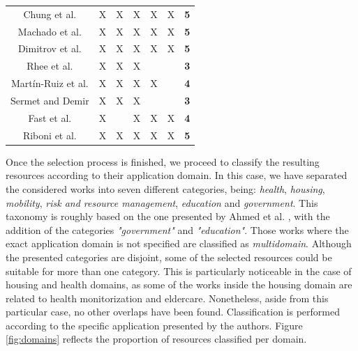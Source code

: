 \begin{table}[H]
{\begin{tabular}{ccccccc}
Chung et al. \citep{chungetal2018}          & X           & X           & X           & X           & X           & \textbf{5}                \\ 
Machado et al. \citep{machadoetal}        & X           & X           & X           & X           & X           & \textbf{5}                \\ 
Dimitrov et al. \citep{dimitrovetal}       & X           & X           & X           & X           & X           & \textbf{5}                \\ 
Rhee et al. \citep{rheeetal}            & X           & X           & X           &             &             & \textbf{3}                \\ 
Martín-Ruiz et al. \citep{Martinruizetal}    & X           & X           & X           & X           &             & \textbf{4}                \\ 
Sermet and Demir \citep{sermetetal}      & X           & X           & X           &             &             & \textbf{3}                \\ 
Fast et al. \citep{fastetal}           & X           &             & X           & X           & X           & \textbf{4}                \\ 
Riboni et al. \citep{ribonietal}         & X           & X           & X           & X           & X           & \textbf{5}                \\ \bottomrule
\end{tabular}
}
\end{table}


Once the selection process is finished, we proceed to classify the resulting resources according to their application domain. In this case, we have separated the considered works into seven different categories, being: \textit{health}, \textit{housing}, \textit{mobility}, \textit{risk and resource management}, \textit{education} and \textit{government}. This taxonomy is roughly based on the one presented by Ahmed et al. \citep{ahmedetal}, with the addition of the categories \textit{"government"} and \textit{"education"}. Those works where the exact application domain is not specified are classified as \textit{multidomain}. Although the presented categories are disjoint, some of the selected resources could be suitable for more than one category. This is particularly noticeable in the case of housing and health domains, as some of the works inside the housing domain are related to health monitorization and eldercare. Nonetheless, aside from this particular case, no other overlaps have been found. Classification is performed according to the specific application presented by the authors. Figure \ref{fig:domains} reflects the proportion of resources classified per domain. 

